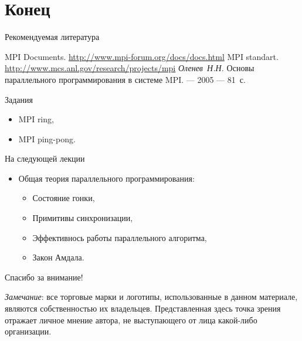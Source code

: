 \section*{Конец}

\begin{frame}[allowframebreaks]{Рекомендуемая литература}
\begin{thebibliography}{99}
    \bibitem{} MPI Documents. \url{http://www.mpi-forum.org/docs/docs.html}
    \bibitem{} MPI standart. \url{http://www.mcs.anl.gov/research/projects/mpi}
    \bibitem{} \textit{Оленев~Н.Н.} Основы параллельного программирования в
    системе MPI. --- 2005 --- 81~с.
\end{thebibliography}
\end{frame}

\begin{frame}{Задания}
\begin{itemize}
    \item MPI ring,
    \item MPI ping-pong.
\end{itemize}
\end{frame}

\begin{frame}{На следующей лекции}
\begin{itemize}
    \item Общая теория параллельного программирования:
    \begin{itemize}
        \item Состояние гонки,
        \item Примитивы синхронизации,
        \item Эффективнось работы параллельного алгоритма,
        \item Закон Амдала.
    \end{itemize}
\end{itemize}
\end{frame}

\begin{frame}

{\huge{Спасибо за внимание!}\par}

\vfill

\tiny{\textit{Замечание}: все торговые марки и логотипы, использованные в данном материале, являются собственностью их владельцев. Представленная здесь точка зрения отражает личное мнение автора, не выступающего от лица какой-либо организации.}

\end{frame}


